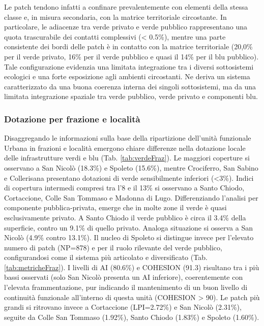\documentclass[
  a4paper,
]{book}
\begin{document}
Le patch tendono infatti a confinare prevalentemente con elementi della stessa classe e, in misura secondaria, con la matrice territoriale circostante.
In particolare, le adiacenze tra verde privato e verde pubblico rappresentano una quota trascurabile dei contatti complessivi (\textless{} 0.5\%), mentre una parte consistente dei bordi delle patch è in contatto con la matrice territoriale (20,0\% per il verde privato, 16\% per il verde pubblico e quasi il 14\% per il blu pubblico).
Tale configurazione evidenzia una limitata integrazione tra i diversi sottosistemi ecologici e una forte esposizione agli ambienti circostanti.
Ne deriva un sistema caratterizzato da una buona coerenza interna dei singoli sottosistemi, ma da una limitata integrazione spaziale tra verde pubblico, verde privato e componenti blu.

\subsubsection{Dotazione per frazione e località}\label{dotazione-per-frazione-e-localituxe0}

Disaggregando le informazioni sulla base della ripartizione dell'unità funzionale Urbana in frazioni e località emergono chiare differenze nella dotazione locale delle infrastrutture verdi e blu (Tab. \ref{tab:verdeFraz}).
Le maggiori coperture si osservano a San Nicolò (18.3\%) e Spoleto (15.6\%), mentre Crociferro, San Sabino e Collerisana presentano dotazioni di verde sensibilmente inferiori (\textless3\%).
Indici di copertura intermedi compresi tra l'8 e il 13\% si osservano a Santo Chiodo, Cortaccione, Colle San Tommaso e Madonna di Lugo.
Differenziando l'analisi per componente pubblica-privata, emerge che in molte zone il verde è quasi esclusivamente privato.
A Santo Chiodo il verde pubblico è circa il 3.4\% della superficie, contro un 9.1\% di quello privato.
Analoga situazione si osserva a San Nicolò (4.9\% contro 13.1\%).
Il nucleo di Spoleto si distingue invece per l'elevato numero di patch (NP=878) e per il ruolo rilevante del verde pubblico, configurandosi come il sistema più articolato e diversificato (Tab. \ref{tab:metricheFraz}).
I livelli di AI (80.6\%) e COHESION (91.3) risultano tra i più bassi osservati (solo San Nicolò presenta un AI inferiore), coerentemente con l'elevata frammentazione, pur indicando il mantenimento di un buon livello di continuità funzionale all'interno di questa unità (COHESION \textgreater{} 90).
Le patch più grandi si ritrovano invece a Cortaccione (LPI=2.72\%) e San Nicolò (2.31\%), seguite da Colle San Tommaso (1.92\%), Santo Chiodo (1.83\%) e Spoleto (1.60\%).
\end{document}
